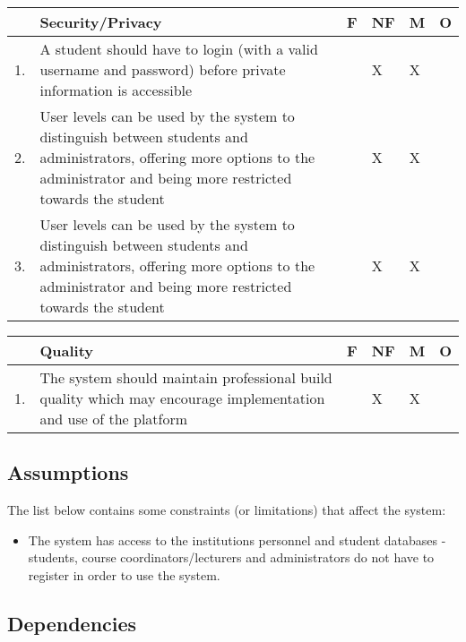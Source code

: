\documentclass{article}
\begin{document}
\begin{center}
\begin{tabular}{|m{1cm}|m{10cm}|m{1cm}|m{1cm}|m{1cm}|m{1cm}|} 
\hline
 & \textbf{Security/Privacy} & \textbf{F} & \textbf{NF} & \textbf{M} & \textbf{O} \\
\hline
1. & {A student should have to login (with a valid username and password) before private information is accessible
} & & X & X & \\
\hline
2. & {User levels can be used by the system to distinguish between students and administrators, offering more options to the administrator and being more restricted towards the student} & & X & X & \\
\hline
3. & {User levels can be used by the system to distinguish between students and administrators, offering more options to the administrator and being more restricted towards the student} & & X & X & \\
\hline
\end{tabular}
\end{center}

\begin{center}
\begin{tabular}{|m{1cm}|m{10cm}|m{1cm}|m{1cm}|m{1cm}|m{1cm}|} 
\hline
 & \textbf{Quality} & \textbf{F} & \textbf{NF} & \textbf{M} & \textbf{O} \\
\hline
1. & {The system should maintain professional build quality which may encourage implementation and use of the platform} & & X & X & \\
\hline
\end{tabular}
\end{center}

\subsection{Assumptions}

The list below contains some constraints (or limitations) that affect the system:

\begin{itemize}
\item The system has access to the institutions personnel and student databases - students, course coordinators/lecturers and administrators do not have to register in order to use the system.
\end{itemize}

\subsection{Dependencies}
\end{document}
